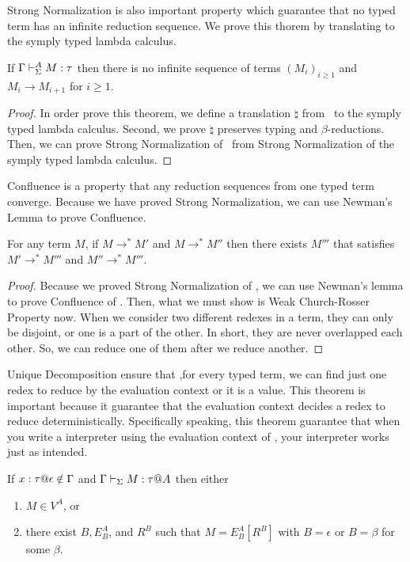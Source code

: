 
Strong Normalization is also important property which guarantee that
no typed term has an infinite reduction sequence.
We prove this thorem by translating \LMD to the symply typed lambda calculus.

\begin{theorem}
	If $\Gamma\vdash_\Sigma^A M:\tau$ then there is no infinite sequence of terms $(M_i)_{i\ge1}$ and 
	$M_i \longrightarrow M_{i+1}$ for $i\ge 1$.
\end{theorem}

\begin{proof}
	In order prove this theorem, we define a translation $\natural$ from \LMD\ to the symply typed lambda calculus.
	Second, we prove $\natural$ preserves typing and $\beta$-reductions.
	Then, we can prove Strong Normalization of \LMD\ from Strong Normalization of the symply typed lambda calculus.
\end{proof}

Confluence is a property that any reduction sequences from one typed term converge.
Because we have proved Strong Normalization, we can use Newman's Lemma to prove Confluence.

\begin{theorem}[Confluence]
	For any term $M$, if $M \longrightarrow^* M'$ and $M \longrightarrow^* M''$ then
	there exists $M'''$ that satisfies $M' \longrightarrow^* M'''$ and $M'' \longrightarrow^* M'''$.
\end{theorem}

\begin{proof}
	Because we proved Strong Normalization of \LMD, 
	we can use Newman's lemma to prove Confluence of \LMD.
	Then, what we must show is Weak Church-Rosser Property now.
	When we consider two different redexes in a \LMD term, they can only be disjoint, or one is a part of the other.
	In short, they are never overlapped each other.
	So, we can reduce one of them after we reduce another.
\end{proof}

Unique Decomposition ensure that
,for every typed term, we can find just one redex to reduce by the evaluation context or it is a value.
This theorem is important because it guarantee
that the evaluation context decides a redex to reduce deterministically.
Specifically speaking, this theorem guarantee that 
when you write a interpreter using the evaluation context of \LMD,
your interpreter works just as intended.

\begin{theorem}
	If $x:\tau @\epsilon \notin \Gamma$ and $\Gamma \vdash_\Sigma M : \tau @ A$ then either
	\begin{enumerate}
		\item $ M \in V^A$, or
		\item there exist $B, E^A_B$, and $R^B$ such that $M = E^A_B[R^B]$ with $B = \epsilon$ or $B = \beta$ for some $\beta$.
	\end{enumerate}
\end{theorem}

